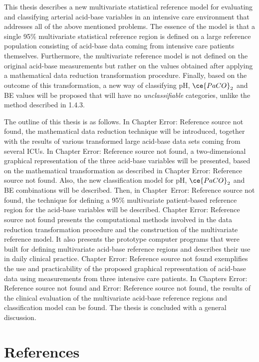 \documentclass[
  12pt,
  a4paperpaper,
]{report}
\begin{document}
This thesis describes a new multivariate statistical reference model for
evaluating and classifying arterial acid-base variables in an intensive
care environment that addresses all of the above mentioned problems. The
essence of the model is that a single 95\% multivariate statistical
reference region is defined on a large reference population consisting
of acid-base data coming from intensive care patients themselves.
Furthermore, the multivariate reference model is not defined on the
original acid-base measurements but rather on the values obtained after
applying a mathematical data reduction transformation procedure.
Finally, based on the outcome of this transformation, a new way of
classifying pH, \(\ce{PaCO}_{2}\) and BE values will be proposed that
will have no \emph{unclassifiable} categories, unlike the method
described in 1.4.3.

The outline of this thesis is as follows. In Chapter Error: Reference
source not found, the mathematical data reduction technique will be
introduced, together with the results of various transformed large
acid-base data sets coming from several ICUs. In Chapter Error:
Reference source not found, a two-dimensional graphical representation
of the three acid-base variables will be presented, based on the
mathematical transformation as described in Chapter Error: Reference
source not found. Also, the new classification model for pH,
\(\ce{PaCO}_{2}\) and BE combinations will be described. Then, in
Chapter~Error: Reference source not found, the technique for defining a
95\% multivariate patient-based reference region for the acid-base
variables will be described. Chapter Error: Reference source not found
presents the computational methods involved in the data reduction
transformation procedure and the construction of the multivariate
reference model. It also presents the prototype computer programs that
were built for defining multivariate acid-base reference regions and
describes their use in daily clinical practice. Chapter Error: Reference
source not found exemplifies the use and practicability of the proposed
graphical representation of acid-base data using measurements from three
intensive care patients. In Chapters Error: Reference source not found
and Error: Reference source not found, the results of the clinical
evaluation of the multivariate acid-base reference regions and
classification model can be found. The thesis is concluded with a
general discussion.

\hypertarget{references}{%
\section{References}\label{references}}
\end{document}
